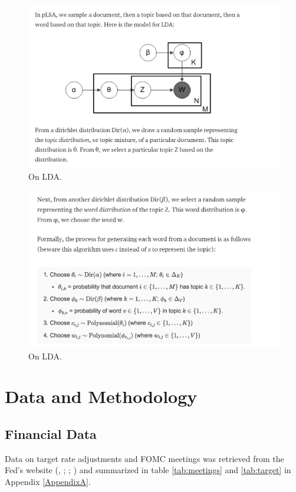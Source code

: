 \documentclass[11pt,a4paper,english,oneside]{book}
\numberwithin{equation}{chapter}
\begin{document}
\begin{figure}
	\caption{On LDA.}
	\centering
	\includegraphics[scale=0.5]{Images/tempPLSA1.png}
\end{figure}

\begin{figure}
	\caption{On LDA.}
	\centering
	\includegraphics[scale=0.5]{Images/tempPLSA2.png}
\end{figure}

\chapter{Data and Methodology}


\section{Financial Data}\label{Ch:financedata}

Data on target rate adjustments and FOMC meetings was retrieved from the Fed's website (\citealp{FRS.2018}, \citeyear{FRS.2013}; \citealp{FOMC.2018Archive}; \citeyear{FOMC.2018}) and summarized in table \ref{tab:meetings} and \ref{tab:target} in Appendix \ref{AppendixA}. 
\end{document}
